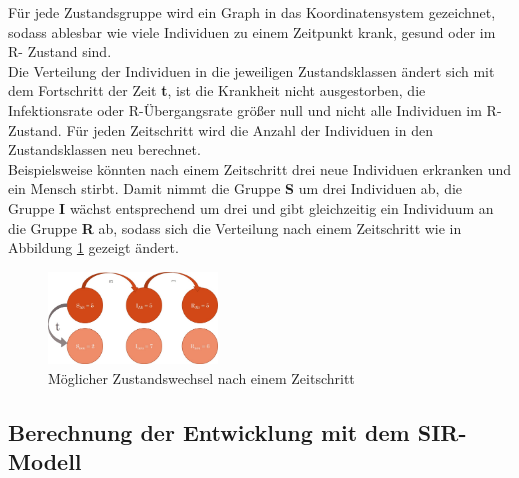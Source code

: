 Für jede Zustandsgruppe wird ein Graph in das Koordinatensystem gezeichnet, sodass ablesbar wie viele Individuen zu einem Zeitpunkt krank, gesund oder im \glqq R\grqq- Zustand sind.\\
Die Verteilung der Individuen in die jeweiligen Zustandsklassen ändert sich mit dem Fortschritt der Zeit \textbf{t}, ist die Krankheit nicht ausgestorben, die Infektionsrate oder \glqq R\grqq-Übergangsrate größer null und nicht alle Individuen im \glqq R\grqq-Zustand.
Für jeden Zeitschritt wird die Anzahl der Individuen in den Zustandsklassen neu berechnet.\\
Beispielsweise könnten nach einem Zeitschritt drei neue Individuen erkranken und ein Mensch stirbt. Damit nimmt die Gruppe  \textbf{S} um drei Individuen ab, die Gruppe \textbf{I} wächst entsprechend um drei und gibt gleichzeitig ein Individuum an die Gruppe \textbf{R} ab, sodass sich die Verteilung nach einem Zeitschritt wie in Abbildung \ref{fig:sch} gezeigt ändert.
\begin{figure}[H]
	\centering
	\includegraphics[width= 0.4\textwidth]{./images/SIR-Berechnung.jpg}\caption{Möglicher Zustandswechsel nach einem Zeitschritt}\label{fig:sch}
\end{figure}

\subsection*{Berechnung der Entwicklung mit dem SIR-Modell}

